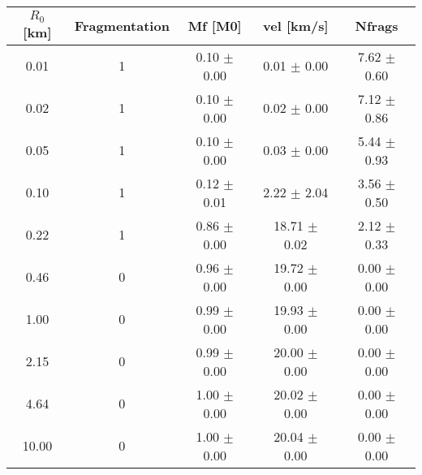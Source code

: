 \begin{tabular}{|c||c||c||c||c|}
\toprule
$R_0$ [km] & Fragmentation & Mf [M0] & vel [km/s] & Nfrags \\
\midrule
0.01 & 1 & 0.10 $\pm$ 0.00 & 0.01 $\pm$ 0.00 & 7.62 $\pm$ 0.60 \\
0.02 & 1 & 0.10 $\pm$ 0.00 & 0.02 $\pm$ 0.00 & 7.12 $\pm$ 0.86 \\
0.05 & 1 & 0.10 $\pm$ 0.00 & 0.03 $\pm$ 0.00 & 5.44 $\pm$ 0.93 \\
0.10 & 1 & 0.12 $\pm$ 0.01 & 2.22 $\pm$ 2.04 & 3.56 $\pm$ 0.50 \\
0.22 & 1 & 0.86 $\pm$ 0.00 & 18.71 $\pm$ 0.02 & 2.12 $\pm$ 0.33 \\
0.46 & 0 & 0.96 $\pm$ 0.00 & 19.72 $\pm$ 0.00 & 0.00 $\pm$ 0.00 \\
1.00 & 0 & 0.99 $\pm$ 0.00 & 19.93 $\pm$ 0.00 & 0.00 $\pm$ 0.00 \\
2.15 & 0 & 0.99 $\pm$ 0.00 & 20.00 $\pm$ 0.00 & 0.00 $\pm$ 0.00 \\
4.64 & 0 & 1.00 $\pm$ 0.00 & 20.02 $\pm$ 0.00 & 0.00 $\pm$ 0.00 \\
10.00 & 0 & 1.00 $\pm$ 0.00 & 20.04 $\pm$ 0.00 & 0.00 $\pm$ 0.00 \\
\bottomrule
\end{tabular}
